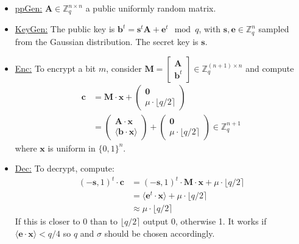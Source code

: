 \documentclass[10pt,a4paper,nobib]{tufte-handout}
\begin{document}
\begin{itemize}
  \item \underline{ppGen:} $\mathbf{A} \in \mathbb{Z}^{n\times n}_q$ a public uniformly random matrix.
  \item \underline{KeyGen:} The public key is $\mathbf{b}^t = \mathbf{s}^t\mathbf{A} + \mathbf{e}^t \mod q$, with $\mathbf{s}, \mathbf{e} \in \mathbb{Z}^n_q$ sampled from the Gaussian distribution. The secret key is $\mathbf{s}$.
  \item \underline{Enc:} To encrypt a bit $m$, consider $\mathbf{M} = \left[ \begin{smallmatrix}
    \mathbf{A} \\
    \mathbf{b}^t
  \end{smallmatrix}\right] \in \mathbb{Z}^{(n+1)\times n}_q$ and compute
  \begin{align*}
    \mathbf{c} &= \mathbf{M}\cdot\mathbf{x} + \left(
               \begin{smallmatrix}
                 \mathbf{0} \\
                 \mu \cdot \lfloor q/2 \rceil
               \end{smallmatrix} \right)\\
               &= \left(\begin{smallmatrix}
                 \mathbf{A}\cdot \mathbf{x} \\
                 \langle \mathbf{b}\cdot \mathbf{x}\rangle
               \end{smallmatrix} \right) +
               \left( 
               \begin{smallmatrix}
                 \mathbf{0} \\
                 \mu \cdot \lfloor q/2 \rceil
               \end{smallmatrix} \right) \in \mathbb{Z}^{n+1}_q
  \end{align*}
  where $\mathbf{x}$ is uniform in $\{0, 1\}^n$.
  \item \underline{Dec:}  To decrypt, compute: 
\begin{align*}
  (-\mathbf{s}, 1)^t \cdot \mathbf{c} &= (-\mathbf{s}, 1)^t \cdot \mathbf{M} \cdot \mathbf{x} + \mu \cdot \lfloor q/2 \rceil \\
                                      &= \langle \mathbf{e}^t \cdot \mathbf{x} \rangle + \mu \cdot \lfloor q/2 \rceil \\
                                      &\approx  \mu \cdot \lfloor q/2 \rceil
\end{align*}
If this is closer to 0 than to $\lfloor q/2 \rceil$ output 0, otherwise 1. It works if $\langle \mathbf{e} \cdot \mathbf{x} \rangle < q/4$ so $q$ and $\sigma$ should be chosen accordingly.
\end{itemize}
\end{document}
